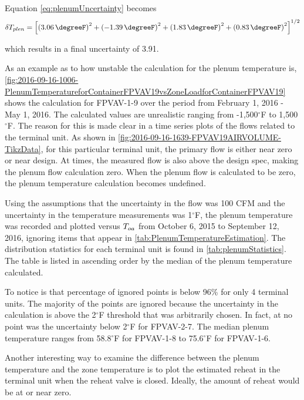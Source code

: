 Equation \ref{eq:plenumUncertainty} becomes
\begin{equation}\label{eq:plenumUncertainty}
    \delta T_{plen} = \left[\left(  \SI{3.06}{\degreeF}  \right)^2  +\left( \SI{-1.39}{\degreeF}  \right)^2 +  \left( \SI{1.83}{\degreeF} \right)^2 + \left(\SI{0.83}{\degreeF}  \right)^2  \right]^{1/2}
\end{equation}

which results in a final uncertainty of \SI{3.91}{\degreeF}.

As an example as to how unstable the calculation for the plenum temperature is, \figref{} \ref{fig:2016-09-16-1006-PlenumTemperatureforContainerFPVAV19vsZoneLoadforContainerFPVAV19} shows the calculation for FPVAV-1-9 over the period from February 1, 2016 - May 1, 2016. The calculated values are unrealistic ranging from -1,500\(^\circ\)F to 1,500\(^\circ\)F. The reason for this is made clear in a time series plots of the flows related to the terminal unit. As shown in \figref{} \ref{fig:2016-09-16-1639-FPVAV19AIRVOLUME-TikzData}, for this particular terminal unit, the primary flow is either near zero or near design. At times, the measured flow is also above the design spec, making the plenum flow calculation zero. When the plenum flow is calculated to be zero, the plenum temperature calculation becomes undefined.


Using the assumptions that the uncertainty in the flow was 100 CFM and the uncertainty in the temperature measurements was 1\(^\circ\)F, the plenum temperature was recorded and plotted versus \(T_{oa}\) from October 6, 2015 to September 12, 2016, ignoring items that appear in \tableref{} \ref{tab:PlenumTemperatureEstimation}. The distribution statistics for each terminal unit is found in \tableref{} \ref{tab:plenumStatistics}. The table is listed in ascending order by the median of the plenum temperature calculated.

To notice is that percentage of ignored points is below 96\% for only 4 terminal units.
The majority of the points are ignored because the uncertainty in the calculation is above the 2\(^\circ\)F threshold that was arbitrarily chosen.
In fact, at no point was the uncertainty below 2\(^\circ\)F for FPVAV-2-7.
The median plenum temperature ranges from 58.8\(^\circ\)F for FPVAV-1-8 to 75.6\(^\circ\)F for FPVAV-1-6.

Another interesting way to examine the difference between the plenum temperature and the zone temperature is to plot the estimated reheat in the terminal unit when the reheat valve is closed.
Ideally, the amount of reheat would be at or near zero. 

